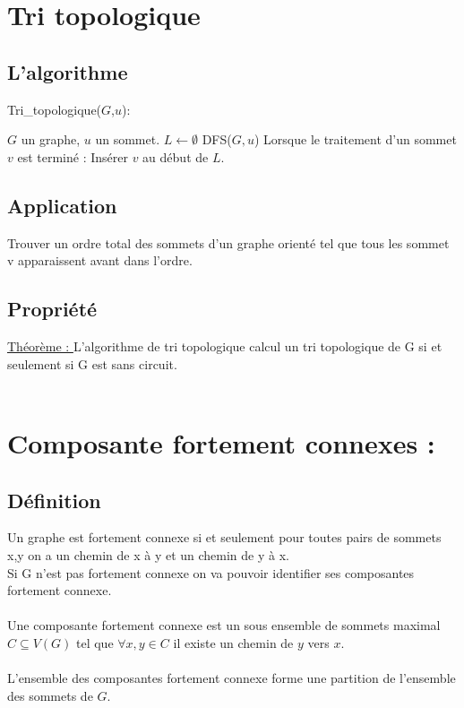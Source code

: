 \documentclass{article}
\begin{document}
\section{Tri topologique}
\subsection{L'algorithme}
\begin{algorithm}
\caption{Tri\_topologique($G$,$u$):}
\begin{algorithmic}
\REQUIRE $G$ un graphe, $u$ un sommet.
\STATE $L \leftarrow \emptyset$ 
\STATE DFS($G,u$) 
\STATE Lorsque le traitement d’un sommet $v$ est terminé : Insérer $v$ au début de $L$. 
\end{algorithmic}
\end{algorithm}
\subsection{Application}
Trouver un ordre total des sommets d’un graphe orienté tel que tous les sommet v apparaissent avant dans l’ordre.
\subsection{Propriété}
\underline{Théorème : }
L’algorithme de tri topologique calcul un tri topologique de G si et seulement si G est sans circuit. \\
\\
\section{Composante fortement connexes : }
\subsection{Définition}
Un graphe est fortement connexe si et seulement pour toutes pairs de sommets x,y on a un chemin de x à y et un chemin de y à x. \\
Si G n’est pas fortement connexe on va pouvoir identifier ses composantes fortement connexe. \\
\\
Une composante fortement connexe est un sous ensemble de sommets maximal $C \subseteq V(G)$ tel que $\forall x,y\in C$ il existe un chemin de $y$ vers $x$.\\ 
\\
L’ensemble des composantes fortement connexe forme une partition de l’ensemble des sommets de $G$. \\ 
\newpage
\end{document}
